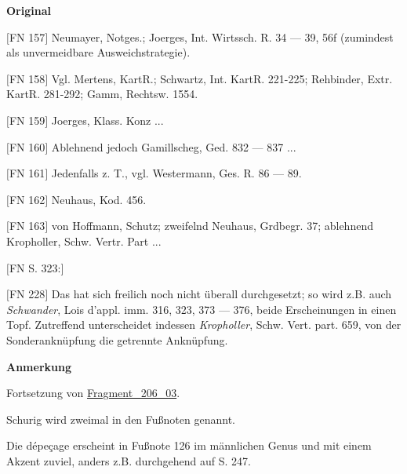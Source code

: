 \documentclass[ngerman,final,fontsize=12pt,paper=a4,twoside,bibliography=totocnumbered,BCOR=8mm,draft=false]{scrartcl}
\newenvironment{fragment}
	{\begin{snugshade}}
	{\end{snugshade}
	 \penalty-200
	 \vskip 0pt plus 10mm minus 5mm}
\newenvironment{fragmentpart}[1]
	{\noindent\textbf{#1}\par\penalty500}
	{\par}
\begin{document}
\begin{fragment}
\begin{fragmentpart}{Original \cite[S.~41,~323 Z.~5--13,~3--15]{Schurig-1981}}
{$[$FN 157$]$ Neumayer, Notges.; Joerges, Int. Wirtssch. R. 34 --- 39, 56f (zumindest als \textquotedbl{}unvermeidbare Ausweichstrategie\textquotedbl{}).

$[$FN 158$]$ Vgl. Mertens, KartR.; Schwartz, Int. KartR. 221-225; Rehbinder, Extr. KartR. 281-292; Gamm, Rechtsw. 1554.

$[$FN 159$]$ Joerges, Klass. Konz ...

$[$FN 160$]$ Ablehnend jedoch Gamillscheg, Ged. 832 --- 837 ...

$[$FN 161$]$ Jedenfalls z. T., vgl. Westermann, Ges. R. 86 --- 89.

$[$FN 162$]$ Neuhaus, Kod. 456.

$[$FN 163$]$ von Hoffmann, Schutz; zweifelnd Neuhaus, Grdbegr. 37; ablehnend Kropholler, Schw. Vertr. Part ... 

$[$FN S. 323:$]$

$[$FN 228$]$ Das hat sich freilich noch nicht überall durchgesetzt; so wird z.B. auch \textsl{Schwander}, Lois d’appl. imm. 316, 323, 373 --- 376, beide Erscheinungen in einen Topf. Zutreffend unterscheidet indessen \textsl{Kropholler}, Schw. Vert. part. 659, von der \textquotedbl{}Sonderanknüpfung\textquotedbl{} die \textquotedbl{}getrennte Anknüpfung\textquotedbl{}.}
\end{fragmentpart}
\begin{fragmentpart}{Anmerkung}
Fortsetzung von \hyperlink{Lm-Fragment-206-03}{Fragment\_206\_03}.

Schurig wird zweimal in den Fußnoten genannt.

Die dépeçage erscheint in Fußnote 126 im männlichen Genus und mit einem Akzent zuviel, anders z.B. durchgehend auf S. 247.
\end{fragmentpart}
\end{fragment}
\hypertarget{Lm-Fragment-208-14}{}
\end{document}
